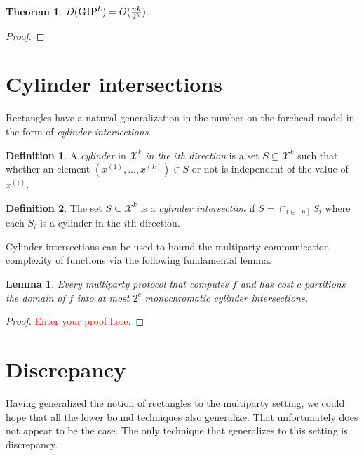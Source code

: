 \documentclass[11pt]{amsart}
\theoremstyle{plain}
\newtheorem{theorem}{Theorem}
\newtheorem{lemma}{Lemma}
\theoremstyle{definition}
\newtheorem{definition}{Definition}
\theoremstyle{plain}
\newcommand{\calX}{\mathcal{X}}
\newcommand{\GIP}{\textsc{GIP}}
\newcommand{\replacethistext}[1]{\textcolor{red}{#1}}
\begin{document}
\begin{theorem}
$D(\GIP^k) = O(\frac{nk}{2^k})$.
\end{theorem}

\begin{proof}

\end{proof}



\newpage 
\section{Cylinder intersections}

Rectangles have a natural generalization in the number-on-the-forehead model in the form of \emph{cylinder intersections}.

\begin{definition}
A \emph{cylinder} in $\calX^k$ \emph{in the $i$th direction} is a set $S \subseteq \calX^k$ such that whether an element $(x^{(1)},\ldots,x^{(k)}) \in S$ or not is independent of the value of $x^{(i)}$.
\end{definition}

\begin{definition}
The set $S \subseteq \calX^k$ is a \emph{cylinder intersection} if $S = \cap_{i \in [n]} S_i$ where each $S_i$ is a cylinder in the $i$th direction.
\end{definition}

Cylinder intersections can be used to bound the multiparty communication complexity of functions via the following fundamental lemma.

\begin{lemma}
Every multiparty protocol that computes $f$ and has cost $c$ partitions the domain of $f$ into at most $2^c$ monochromatic cylinder intersections.
\end{lemma}

\begin{proof}
\replacethistext{Enter your proof here.}
\end{proof}



\newpage 
\section{Discrepancy}

Having generalized the notion of rectangles to the multiparty setting, we could hope that all the lower bound techniques also generalize. That unfortunately does not appear to be the case. The only technique that generalizes to this setting is discrepancy.
\end{document}
